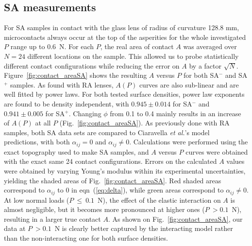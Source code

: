 \documentclass[pre,groupedaddress,showkeys,showpacs,twocolumn]{revtex4}
\begin{document}
\subsection*{SA measurements}
%
For SA samples in contact with the glass lens of radius of curvature 128.8 mm, microcontacts always occur at the top of the asperities for the whole investigated $P$ range up to 0.6~N. For each $P$, the real area of contact $A$ was averaged over $N=24$ different locations on the sample. This allowed us to probe statistically different contact configurations while reducing the error on $A$ by a factor $\sqrt{N}$. Figure~\ref{fig:contact_areaSA} shows the resulting $A$ versus $P$ for both SA$^-$ and SA$^+$ samples. As found with RA lenses, $A(P)$ curves are also sub-linear and are well fitted by power laws. For both tested surface densities, power law exponents are found to be density independent, with $0.945 \pm 0.014$ for SA$^-$ and $0.941 \pm 0.005$ for SA$^+$. Changing $\phi$ from 0.1 to 0.4 mainly results in an increase of $A(P)$ at all $P$ (Fig.~\ref{fig:contact_areaSA}). As previously done with RA samples, both SA data sets are compared 
to Ciaravella \textit{et al.}'s model~\cite{ciavarella2006,ciavarella2008} predictions, with both $\alpha_{ij}=0$ and $\alpha_{ij} \neq 0$. Calculations were performed using the exact topography used to make SA samples, and $A$ versus $P$ curves were obtained with the exact same 24 contact configurations. Errors on the calculated $A$ values were obtained by varying Young's modulus within its experimental uncertainties, yielding the shaded areas of Fig.~\ref{fig:contact_areaSA}. Red shaded areas correspond to $\alpha_{ij}$ to 0 in eqn~(\ref{eq:delta}), while green areas correspond to $\alpha_{ij} \neq 0$. At low normal loads ($P~\le~0.1$~N), the effect of the elastic interaction on $A$ is almost negligible, but it becomes more pronounced at higher ones ($P~>0.1$~N), resulting in a larger true contact $A$. As shown on Fig.~\ref{fig:contact_areaSA}, our data at $P~>0.1$~N is clearly better captured by the interacting model rather than the non-interacting one for both surface densities.\\
\end{document}
